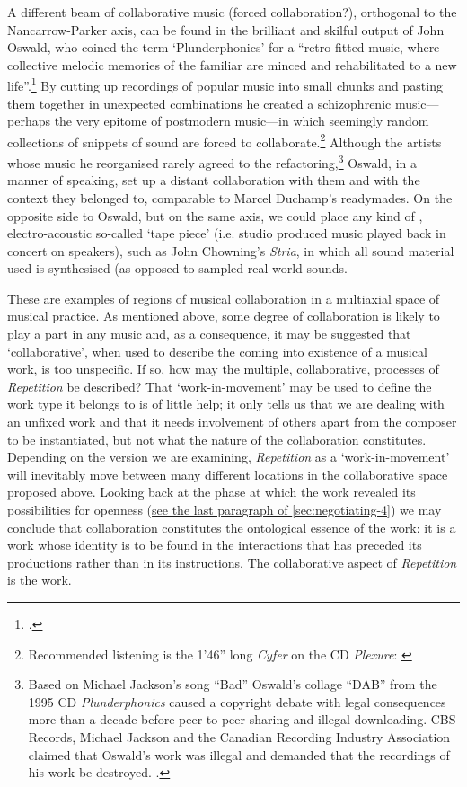 \label{sec:5-par:3}
A different beam of collaborative music (forced collaboration?), orthogonal to the Nancarrow-Parker axis, can be found in the brilliant and skilful output of John Oswald, who coined the term `Plunderphonics' for a ``retro-fitted music, where collective melodic memories of the familiar are minced and rehabilitated to a new life''.\footcite[Oswald quoted in][49]{lebaron02} By cutting up recordings of popular music into small chunks and pasting them together in unexpected combinations he created a schizophrenic music---perhaps the very epitome of postmodern music---in which seemingly random collections of snippets of sound are forced to collaborate.\footnote{Recommended listening is the 1'46'' long \emph{Cyfer} on the CD \emph{Plexure}: \cite{plexure93}} Although the artists whose music he reorganised rarely agreed to the refactoring,\footnote{Based on Michael Jackson's song ``Bad'' Oswald's collage ``DAB'' from the 1995 CD \emph{Plunderphonics} caused a copyright debate with legal consequences more than a decade before peer-to-peer sharing and illegal downloading. CBS Records, Michael Jackson and the Canadian Recording Industry Association claimed that Oswald's work was illegal and demanded that the recordings of his work be destroyed. \cite[See][]{wired95}.} Oswald, in a manner of speaking, set up a distant collaboration with them and with the context they belonged to, comparable to Marcel Duchamp's readymades. On the opposite side to Oswald, but on the same axis, we could place any kind of , electro-acoustic so-called `tape piece' (i.e. studio produced music played back in concert on speakers), such as John Chowning's \emph{Stria}, in which all sound material used is synthesised (as opposed to sampled real-world sounds.

\label{sec:5-par:4}
These are examples of regions of musical collaboration in a multiaxial space of musical practice. As mentioned above, some degree of collaboration is likely to play a part in any music and, as a consequence, it may be suggested that `collaborative', when used to describe the coming into existence of a musical work, is too unspecific. If so, how may the multiple, collaborative,  processes of \emph{Repetition} be described? That `work-in-movement' may be used to define the work type it belongs to is of little help; it only tells us that we are dealing with an unfixed work and that it needs involvement of others apart from the composer to be instantiated, but not what the nature of the collaboration constitutes. Depending on the version we are examining, \emph{Repetition} as a `work-in-movement' will inevitably move between many different locations in the collaborative space proposed above. Looking back at the phase at which the work revealed its possibilities for openness (\hyperref[sec:4-par:5]{see the last paragraph of \ref{sec:negotiating-4}}) we may conclude that collaboration constitutes the ontological essence of the work: it is a work whose identity is to be found in the interactions that has preceded its productions rather than in its instructions. The collaborative aspect of \emph{Repetition} is the work.


